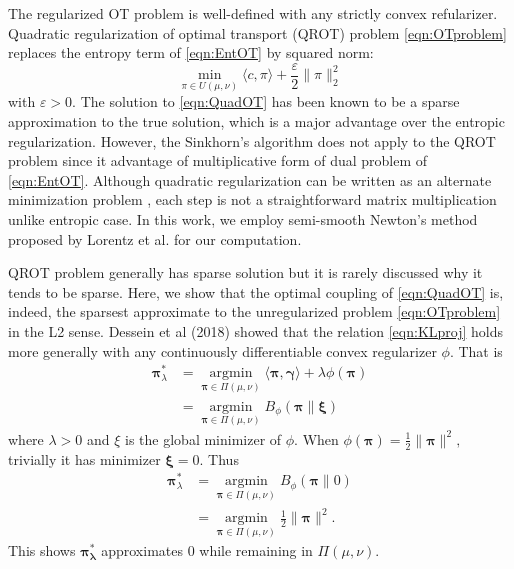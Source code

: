 \documentclass{article}
\newcommand{\half}{\frac{1}{2}}
\newcommand{\red}[1]{\textcolor{red}{#1}}
\begin{document}
The regularized OT problem is well-defined with any strictly convex refularizer. 
Quadratic regularization of optimal transport (QROT) problem \eqref{eqn:OTproblem} replaces the entropy term of \eqref{eqn:EntOT} by squared norm:
\begin{equation}\label{eqn:QuadOT}
    \min_{\pi\in U(\mu, \nu)} \langle c, \pi \rangle + \frac{\varepsilon}{2} \|\pi\|^2_2
\end{equation}
with $\varepsilon>0.$
The solution to \eqref{eqn:QuadOT} has been known to be a sparse approximation to the true solution, which is a major advantage over the entropic regularization.
However, the Sinkhorn's algorithm does not apply to the QROT problem since it advantage of multiplicative form of dual problem of \eqref{eqn:EntOT}. 
Although quadratic regularization can be written as an alternate minimization problem \cite{lorenz2021quadratically}, each step is not a straightforward matrix multiplication unlike entropic case. 
In this work, we employ semi-smooth Newton's method proposed by Lorentz et al. \cite{lorenz2021quadratically} for our computation. 

QROT problem generally has sparse solution but it is rarely discussed why it tends to be sparse. 
Here, we show that the optimal coupling of \eqref{eqn:QuadOT} is, indeed, the sparsest approximate to the unregularized problem \eqref{eqn:OTproblem} in the L2 sense. 
Dessein et al (2018)\cite{dessein2018regularized} showed that the relation \eqref{eqn:KLproj} holds more generally with any continuously differentiable convex regularizer $\phi$.
That is 
\begin{align}\label{eqn:BregProj}
    \boldsymbol{\pi}_{\lambda}^* 
    &= \underset{\boldsymbol{\pi} \in \Pi(\mu, \nu)}{\operatorname{argmin}}\langle\boldsymbol{\pi}, \boldsymbol{\gamma}\rangle+\lambda \phi(\boldsymbol{\pi})\\
    &= \underset{\boldsymbol{\pi} \in \Pi(\mu, \nu)}{\operatorname{argmin}} B_{\phi}(\boldsymbol{\pi} \| \boldsymbol{\xi})
\end{align}
where $\lambda>0$ and $\xi$ is the global minimizer of $\phi.$
When $\phi(\boldsymbol{\pi}) = \half\|\boldsymbol{\pi}\|^2,$ trivially it has minimizer $\boldsymbol{\xi} = 0$. Thus
\begin{align}
    \boldsymbol{\pi}_{\lambda}^* 
    &= \underset{\boldsymbol{\pi} \in \Pi(\mu, \nu)}{\operatorname{argmin}} B_{\phi}(\boldsymbol{\pi} \| 0)\\
    &= \underset{\boldsymbol{\pi} \in \Pi(\mu, \nu)}{\operatorname{argmin}} \half\|\boldsymbol{\pi}\|^2.
\end{align}
This shows $\boldsymbol{\pi^*_\lambda}$ approximates 0 while remaining in $\Pi(\mu, \nu).$
\end{document}
